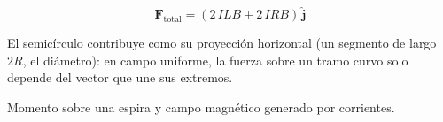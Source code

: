 \documentclass[12pt,a4paper]{article}
\begin{document}
\begin{keybox}
  \[
  \boxed{\mathbf{F}_{\text{total}} = (2\,ILB + 2\,IRB)\,\hat{\mathbf{j}}}
  \]
\end{keybox}

\begin{notebox}[Interpretación]
  El semicírculo contribuye como su proyección horizontal (un segmento de
  largo $2R$, el diámetro): en campo uniforme, la fuerza sobre un tramo
  curvo solo depende del vector que une sus extremos.
\end{notebox}

\begin{notebox}
  Momento sobre una espira y campo magnético generado por corrientes.
\end{notebox}
\end{document}
